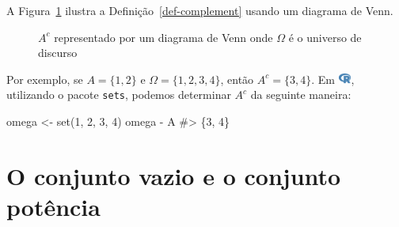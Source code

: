 \documentclass[
  letterpaper,
]{book}
\newenvironment{Shaded}{\begin{snugshade}}{\end{snugshade}}
\newcommand{\CommentTok}[1]{\textcolor[rgb]{0.37,0.37,0.37}{#1}}
\newcommand{\DecValTok}[1]{\textcolor[rgb]{0.68,0.00,0.00}{#1}}
\newcommand{\FunctionTok}[1]{\textcolor[rgb]{0.28,0.35,0.67}{#1}}
\newcommand{\NormalTok}[1]{\textcolor[rgb]{0.00,0.23,0.31}{#1}}
\newcommand{\OtherTok}[1]{\textcolor[rgb]{0.00,0.23,0.31}{#1}}
\newcommand{\SpecialCharTok}[1]{\textcolor[rgb]{0.37,0.37,0.37}{#1}}
\theoremstyle{plain}
\theoremstyle{definition}
\theoremstyle{remark}
\begin{document}
A Figura~\ref{fig-complement-venn-diagram} ilustra a
Definição~\ref{def-complement} usando um diagrama de Venn.

\begin{figure}


\caption{\label{fig-complement-venn-diagram}\(A^c\) representado por um
diagrama de Venn onde \(\Omega\) é o universo de discurso}

\end{figure}%

Por exemplo, se \(A = \{ 1, 2 \}\) e \(\Omega = \{ 1, 2, 3, 4 \}\),
então \(A^c = \{ 3, 4 \}\). Em
\includegraphics[width=1.13em,height=1em]{naive_set_theory_files/figure-pdf/fa-icon-9b00320707d42527dde67262afb33ded.pdf},
utilizando o pacote \texttt{sets}, podemos determinar \(A^c\) da
seguinte maneira:

\begin{Shaded}
\begin{Highlighting}[]
\NormalTok{omega }\OtherTok{\textless{}{-}} \FunctionTok{set}\NormalTok{(}\DecValTok{1}\NormalTok{, }\DecValTok{2}\NormalTok{, }\DecValTok{3}\NormalTok{, }\DecValTok{4}\NormalTok{)}
\NormalTok{omega }\SpecialCharTok{{-}}\NormalTok{ A}
\CommentTok{\#\textgreater{} \{3, 4\}}
\end{Highlighting}
\end{Shaded}

\section{O conjunto vazio e o conjunto
potência}\label{o-conjunto-vazio-e-o-conjunto-potuxeancia}
\end{document}
